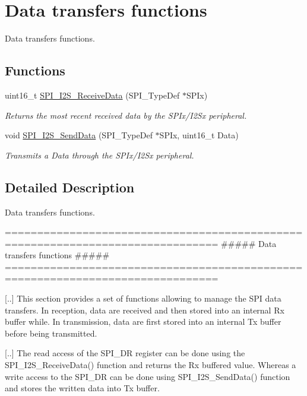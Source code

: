 \hypertarget{group___s_p_i___group2}{}\section{Data transfers functions}
\label{group___s_p_i___group2}


Data transfers functions.  


\subsection*{Functions}
\begin{DoxyCompactItemize}
\item 
uint16\+\_\+t \mbox{\hyperlink{group___s_p_i___group2_gab77de76547f3bff403236b263b070a30}{S\+P\+I\+\_\+\+I2\+S\+\_\+\+Receive\+Data}} (S\+P\+I\+\_\+\+Type\+Def $\ast$S\+P\+Ix)
\begin{DoxyCompactList}\small\item\em Returns the most recent received data by the S\+P\+Ix/\+I2\+Sx peripheral. \end{DoxyCompactList}\item 
void \mbox{\hyperlink{group___s_p_i___group2_gad5af40bebe8dbe3fa8bd476489d7e3da}{S\+P\+I\+\_\+\+I2\+S\+\_\+\+Send\+Data}} (S\+P\+I\+\_\+\+Type\+Def $\ast$S\+P\+Ix, uint16\+\_\+t Data)
\begin{DoxyCompactList}\small\item\em Transmits a Data through the S\+P\+Ix/\+I2\+Sx peripheral. \end{DoxyCompactList}\end{DoxyCompactItemize}


\subsection{Detailed Description}
Data transfers functions. 

\begin{DoxyVerb} ===============================================================================
                      ##### Data transfers functions #####
 ===============================================================================  

 [..] This section provides a set of functions allowing to manage the SPI data 
      transfers. In reception, data are received and then stored into an internal 
      Rx buffer while. In transmission, data are first stored into an internal Tx 
      buffer before being transmitted.

 [..] The read access of the SPI_DR register can be done using the SPI_I2S_ReceiveData()
      function and returns the Rx buffered value. Whereas a write access to the SPI_DR 
      can be done using SPI_I2S_SendData() function and stores the written data into 
      Tx buffer.\end{DoxyVerb}
 

